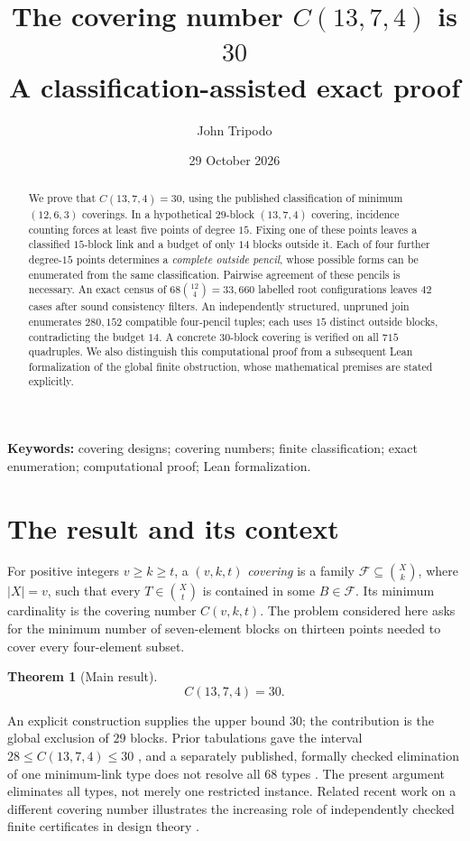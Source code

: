 \documentclass[11pt]{article}
\title{\vspace{-1.3em}\bfseries The covering number $C(13,7,4)$ is $30$\\[0.32em]
\large\normalfont A classification-assisted exact proof}
\author{John Tripodo}
\date{29 October 2026}
\newcommand{\bin}[2]{\binom{#1}{#2}}
\newcommand{\coverfam}{\mathcal F}
\newtheorem{theorem}{Theorem}[section]
\theoremstyle{definition}
\theoremstyle{remark}
\begin{document}
\maketitle
\vspace{-1.3em}
\begin{abstract}\noindent
We prove that $C(13,7,4)=30$, using the published classification of minimum
$(12,6,3)$ coverings. In a hypothetical $29$-block $(13,7,4)$ covering,
incidence counting forces at least five points of degree $15$. Fixing one of
these points leaves a classified $15$-block link and a budget of only $14$
blocks outside it. Each of four further degree-$15$ points determines a
\emph{complete outside pencil}, whose possible forms can be enumerated from
the same classification. Pairwise agreement of these pencils is necessary.
An exact census of $68\bin{12}{4}=33{,}660$ labelled root configurations leaves
$42$ cases after sound consistency filters. An independently structured,
unpruned join enumerates $280{,}152$ compatible four-pencil tuples; each uses
$15$ distinct outside blocks, contradicting the budget $14$. A concrete
$30$-block covering is verified on all $715$ quadruples. We also distinguish
this computational proof from a subsequent Lean formalization of the global
finite obstruction, whose mathematical premises are stated explicitly.
\end{abstract}
\noindent\textbf{Keywords:} covering designs; covering numbers; finite classification;
exact enumeration; computational proof; Lean formalization.
\medskip

\section{The result and its context}
For positive integers $v\geq k\geq t$, a $(v,k,t)$ \emph{covering} is a
family $\coverfam\subseteq\bin{X}{k}$, where $|X|=v$, such that every
$T\in\bin{X}{t}$ is contained in some $B\in\coverfam$. Its minimum cardinality
is the covering number $C(v,k,t)$. The problem considered here asks for the
minimum number of seven-element blocks on thirteen points needed to cover
every four-element subset.

\begin{theorem}[Main result]\label{thm:main}
\[
\boxed{C(13,7,4)=30.}
\]
\end{theorem}

An explicit construction supplies the upper bound $30$; the contribution
is the global exclusion of $29$ blocks. Prior tabulations gave the interval
$28\leq C(13,7,4)\leq30$ \cite{LJCR}, and a separately published,
formally checked elimination of one minimum-link type does not resolve
all $68$ types \cite{Dwares}. The present argument eliminates all types,
not merely one restricted instance. Related recent work on a different
covering number illustrates the increasing role of independently checked
finite certificates in design theory \cite{Krug}.
\end{document}
